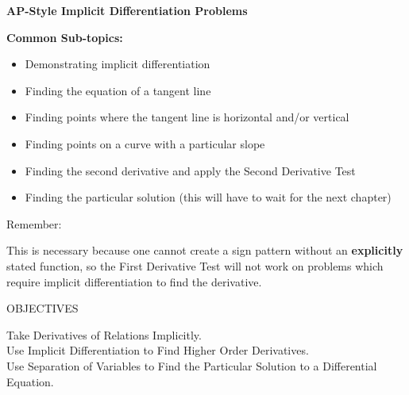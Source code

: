 \bigskip

\textbf{\large{AP-Style Implicit Differentiation Problems}} \par

\textbf{Common Sub-topics:} \begin{itemize}
    \item Demonstrating implicit differentiation 
    \item Finding the equation of a tangent line
    \item Finding points where the tangent line is horizontal and/or vertical
    \item Finding points on a curve with a particular slope
    \item Finding the second derivative and apply the Second Derivative Test
    \item Finding the particular solution (this will have to wait for the next chapter)
\end{itemize}

Remember: 
\begin{center}
\end{center}

This is necessary because one cannot create a sign pattern without an \textbf{explicitly} stated function, so the First Derivative Test will not work on problems which require implicit differentiation to find the derivative. \par

\begin{tcolorbox}[objective]
    \begin{center}
        OBJECTIVES \\[11pt]
    \end{center}
    Take Derivatives of Relations Implicitly. \\
    Use Implicit Differentiation to Find Higher Order Derivatives. \\
    Use Separation of Variables to Find the Particular Solution to a Differential Equation.
\end{tcolorbox} \vspace{11pt}

